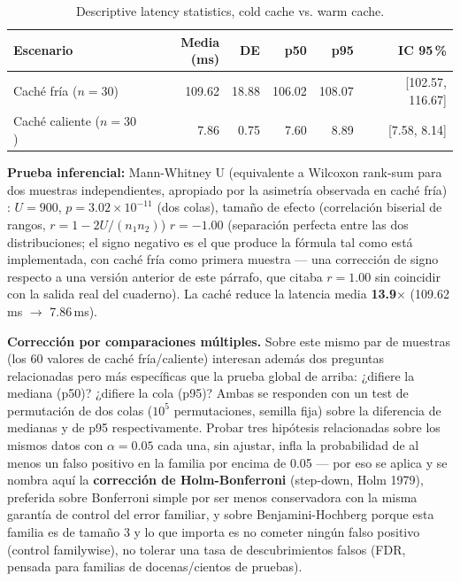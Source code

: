 \begin{table}[H]
\centering
\begin{tabular}{lrrrrr}
\toprule
\textbf{Escenario} & \textbf{Media (ms)} & \textbf{DE} & \textbf{p50} & \textbf{p95} & \textbf{IC 95\,\%} \\
\midrule
Caché fría ($n=30$) & 109.62 & 18.88 & 106.02 & 108.07 & [102.57, 116.67] \\
Caché caliente ($n=30$) & 7.86 & 0.75 & 7.60 & 8.89 & [7.58, 8.14] \\
\bottomrule
\end{tabular}
\caption{Descriptive latency statistics, cold cache vs. warm cache.}
\end{table}

\textbf{Prueba inferencial:} Mann-Whitney U (equivalente a Wilcoxon rank-sum para dos muestras
independientes, apropiado por la asimetría observada en caché fría) \cite{arcuri2011}: $U=900$,
$p = 3.02 \times 10^{-11}$ (dos colas), tamaño de efecto (correlación biserial de rangos,
$r = 1 - 2U/(n_1 n_2)$) $r = -1.00$ (separación perfecta entre las dos distribuciones; el signo negativo
es el que produce la fórmula tal como está implementada, con caché fría como primera muestra --- una
corrección de signo respecto a una versión anterior de este párrafo, que citaba $r=1.00$ sin coincidir
con la salida real del cuaderno). La caché reduce la latencia media
\textbf{13.9$\times$} (109.62\,ms $\to$ 7.86\,ms).

\textbf{Corrección por comparaciones múltiples.} Sobre este mismo par de muestras (los 60 valores de
caché fría/caliente) interesan además dos preguntas relacionadas pero más específicas que la prueba
global de arriba: ¿difiere la mediana (p50)? ¿difiere la cola (p95)? Ambas se responden con un test
de permutación de dos colas ($10^5$ permutaciones, semilla fija) sobre la diferencia de medianas y de
p95 respectivamente. Probar tres hipótesis relacionadas sobre los mismos datos con $\alpha=0.05$ cada
una, sin ajustar, infla la probabilidad de al menos un falso positivo en la familia por encima de
0.05 --- por eso se aplica y se nombra aquí la \textbf{corrección de Holm-Bonferroni} (step-down,
Holm 1979), preferida sobre Bonferroni simple por ser menos conservadora con la misma garantía de
control del error familiar, y sobre Benjamini-Hochberg porque esta familia es de tamaño 3 y lo que
importa es no cometer ningún falso positivo (control familywise), no tolerar una tasa de
descubrimientos falsos (FDR, pensada para familias de docenas/cientos de pruebas).

